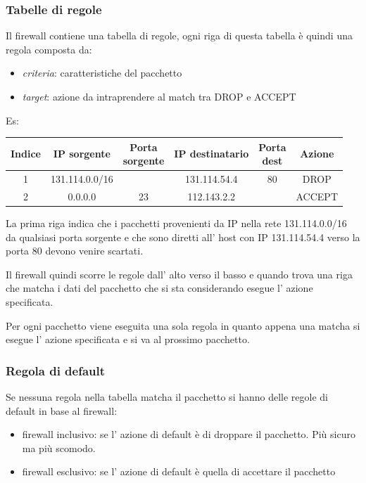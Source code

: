 \subsubsection{Tabelle di regole}
Il firewall contiene una tabella di regole, ogni riga di questa tabella è quindi una regola composta da:
\begin{itemize}
    \item \emph{criteria}: caratteristiche del pacchetto
    \item \emph{target}: azione da intraprendere al match tra DROP e ACCEPT
\end{itemize}
Es:
\begin{table}[ht!]
    \centering
    \begin{tabular}{c|c|c|c|c|c}
        Indice & IP sorgente & \thead{Porta \\ sorgente} & IP destinatario & \thead{Porta \\ dest} & Azione  \\
        \hline
        1 & 131.114.0.0/16 & & 131.114.54.4 & 80 & DROP \\
        2 & 0.0.0.0 & 23 & 112.143.2.2 &  & ACCEPT \\
    \end{tabular}
\end{table}
La prima riga indica che i pacchetti provenienti da IP nella rete 131.114.0.0/16 da qualsiasi porta sorgente e che sono diretti all' host con IP 131.114.54.4 verso la porta 80 devono venire scartati.

Il firewall quindi scorre le regole dall' alto verso il basso e quando trova una riga che matcha i dati del pacchetto che si sta considerando esegue l' azione specificata.

Per ogni pacchetto viene eseguita una sola regola in quanto appena una matcha si esegue l' azione specificata e si va al prossimo pacchetto.

\subsubsection{Regola di default}
Se nessuna regola nella tabella matcha il pacchetto si hanno delle regole di default in base al firewall:
\begin{itemize}
    \item firewall inclusivo: se l' azione di default è di droppare il pacchetto.
    Più sicuro ma più scomodo.
    \item firewall esclusivo: se l' azione di default è quella di accettare il pacchetto
\end{itemize}

